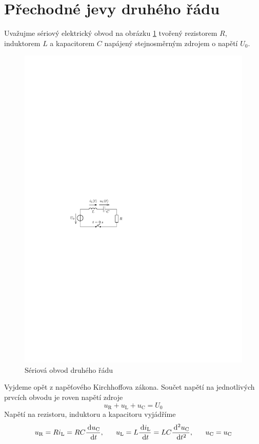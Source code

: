 \section{Přechodné jevy druhého řádu}

Uvažujme sériový elektrický obvod na obrázku \ref{fig:druhy_rad_rlc} tvořený rezistorem $R$, induktorem $L$ a kapacitorem $C$ napájený stejnosměrným zdrojem o napětí $U_0$. 
\begin{figure}[h!]
\centering
\includegraphics[]{prechodne_jevy/druhy_rad/rlc.pdf}
\caption{Sériová obvod druhého řádu}
\label{fig:druhy_rad_rlc}
\end{figure}
Vyjdeme opět z napěťového Kirchhoffova zákona. Součet napětí na jednotlivých prvcích obvodu je roven napětí zdroje
$$
u_\mathrm{R} + u_\mathrm{L} + u_\mathrm{C} = U_0
$$
Napětí na rezistoru, induktoru a kapacitoru vyjádříme
$$
u_\mathrm{R} = Ri_\mathrm{L} = RC \frac{\,\mathrm{d} u_\mathrm{C}}{\,\mathrm{d} t},~~~~~
u_\mathrm{L} = L \frac{\,\mathrm{d} i_\mathrm{L}}{\,\mathrm{d} t} = LC \frac{\,\mathrm{d}^2 u_\mathrm{C}}{\,\mathrm{d} t^2},~~~~~u_\mathrm{C} = u_\mathrm{C}
$$
